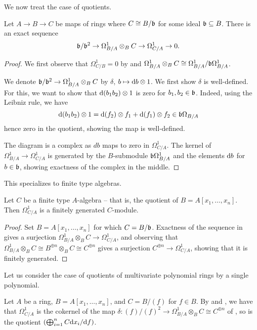 We now treat the case of quotients. 
\begin{proposition}\label{prop: ideal exact sequence}
    Let $A\to B\to C$ be maps of rings where $C\cong B/\mathfrak{b}$ for some ideal $\mathfrak{b}\subseteq B$. There is an exact sequence 
    $$\mathfrak{b}/\mathfrak{b}^{2}\to\Omega_{B/A}^{1}\otimes_{B}C\to\Omega_{C/A}^{1}\to0.$$
\end{proposition}
\begin{proof}
    We first observe that $\Omega^{1}_{C/B}=0$ by  and $\Omega^{1}_{B/A}\otimes_{B}C\cong\Omega_{B/A}^{1}/\mathfrak{b}\Omega^{1}_{B/A}$. 
    
    We denote $\mathfrak{b}/\mathfrak{b}^{2}\to\Omega^{1}_{B/A}\otimes_{B}C$ by $\delta$, $b\mapsto \mathrm{d} b\otimes 1$. We first show $\delta$ is well-defined. For this, we want to show that $\mathrm{d}(b_{1}b_{2})\otimes 1$ is zero for $b_{1},b_{2}\in\mathfrak{b}$. Indeed, using the Leibniz rule, we have 
    $$\mathrm{d}(b_{1}b_{2})\otimes 1 = \mathrm{d}(f_{2})\otimes f_{1}+\mathrm{d}(f_{1})\otimes f_{2}\in\mathfrak{b}\Omega_{B/A}$$
    hence zero in the quotient, showing the map is well-defined. 
    
    The diagram is a complex as $db$ maps to zero in $\Omega^{1}_{C/A}$. The kernel of $\Omega^{1}_{B/A}\to\Omega^{1}_{C/A}$ is generated by the $B$-submodule $\mathfrak{b}\Omega_{B/A}^{1}$ and the elements $\mathrm{d} b$ for $b\in\mathfrak{b}$, showing exactness of the complex in the middle. 
\end{proof}
This specializes to finite type algebras. 
\begin{corollary}\label{corr: kahler differentials are fg module}
    Let $C$ be a finite type $A$-algebra -- that is, the quotient of $B=A[x_{1},\dots,x_{n}]$. Then $\Omega^{1}_{C/A}$ is a finitely generated $C$-module. 
\end{corollary}
\begin{proof}
    Set $B=A[x_{1},\dots,x_{n}]$ for which $C=B/\mathfrak{b}$. Exactness of the sequence in  gives a surjection $\Omega_{B/A}^{1}\otimes_{B}C\to\Omega_{C/A}^{1}$, and observing that $\Omega^{1}_{B/A}\otimes_{B}C\cong B^{\oplus n}\otimes_{B}C\cong C^{\oplus n}$ gives a surjection $C^{\oplus n}\to\Omega_{C/A}^{1}$, showing that it is finitely generated. 
\end{proof}
Let us consider the case of quotients of multivariate polynomial rings by a single polynomial. 
\begin{example}
    Let $A$ be a ring, $B=A[x_{1},\dots,x_{n}]$, and $C=B/(f)$ for $f\in B$. By  and , we have that $\Omega_{C/A}^{1}$ is the cokernel of the map $\delta:(f)/(f)^{2}\to\Omega_{B/A}^{1}\otimes_{B}C\cong C^{\oplus n}$ of , so is the quotient $\left(\bigoplus_{i=1}^{n}C\mathrm{d} x_{i}/\mathrm{d} f\right)$. 
\end{example}
